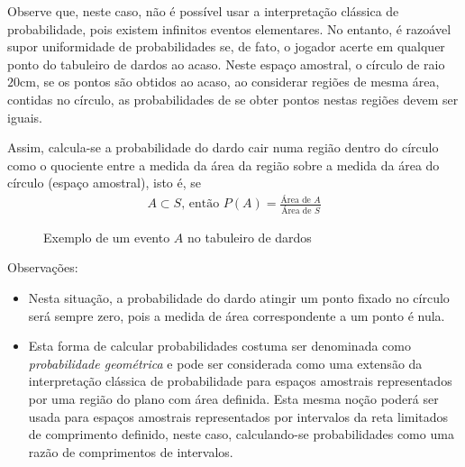 \documentclass[10 pt,usenames,dvipsnames, oneside]{article}
\begin{document}
Observe que, neste caso, não é possível usar a interpretação clássica de probabilidade, pois existem infinitos eventos elementares. No entanto, é razoável supor uniformidade de probabilidades se, de fato, o jogador acerte em qualquer ponto do tabuleiro de dardos ao acaso. Neste espaço amostral, o círculo de raio $20$cm, se os pontos são obtidos ao acaso, ao considerar regiões de mesma área, contidas no círculo, as probabilidades de se obter pontos nestas regiões devem ser iguais.

Assim, calcula-se a probabilidade do dardo cair numa região dentro do círculo como o quociente entre a medida da área da região sobre a medida da área do círculo (espaço amostral), isto é, se
\begin{equation*}
\begin{split}A\subset S \text{, então } P(A)=\displaystyle{\frac{\text{Área de }A}{\text{Área de }S}}\end{split}
\end{equation*}

\begin{figure}[H]
\centering



\caption{Exemplo de um evento \(A\) no tabuleiro de dardos}
\end{figure}

Observações:
\begin{itemize}
\item {} 
Nesta situação, a probabilidade do dardo atingir um ponto fixado no círculo será sempre zero, pois a medida de área correspondente a um ponto é nula.

\item {} 
Esta forma de calcular probabilidades costuma ser denominada como \textit{probabilidade geométrica} e pode ser considerada como uma extensão da interpretação clássica de probabilidade para espaços amostrais representados por uma região do plano com área definida. Esta mesma noção poderá ser usada para espaços amostrais representados por intervalos da reta limitados de comprimento definido, neste caso, calculando-se probabilidades como uma razão de comprimentos de intervalos.

\end{itemize}
\end{document}
